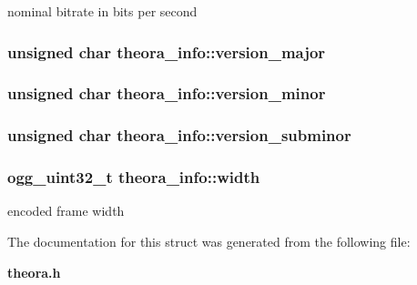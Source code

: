 nominal bitrate in bits per second 

\subsubsection[{version\+\_\+major}]{\setlength{\rightskip}{0pt plus 5cm}unsigned char theora\+\_\+info\+::version\+\_\+major}\label{structtheora__info_a7c5ebb9e6700aaef87f29f7c6074e474}
\subsubsection[{version\+\_\+minor}]{\setlength{\rightskip}{0pt plus 5cm}unsigned char theora\+\_\+info\+::version\+\_\+minor}\label{structtheora__info_a75eda4f30270d833c7b9dba43932a06a}
\subsubsection[{version\+\_\+subminor}]{\setlength{\rightskip}{0pt plus 5cm}unsigned char theora\+\_\+info\+::version\+\_\+subminor}\label{structtheora__info_aa07967ecd6e20bd2928ead42b6397b3d}
\subsubsection[{width}]{\setlength{\rightskip}{0pt plus 5cm}ogg\+\_\+uint32\+\_\+t theora\+\_\+info\+::width}\label{structtheora__info_a17c2fc651bb3329f1ea6b13ff1d3957b}


encoded frame width 



The documentation for this struct was generated from the following file\+:\begin{DoxyCompactItemize}
\item 
{\bf theora.\+h}\end{DoxyCompactItemize}
